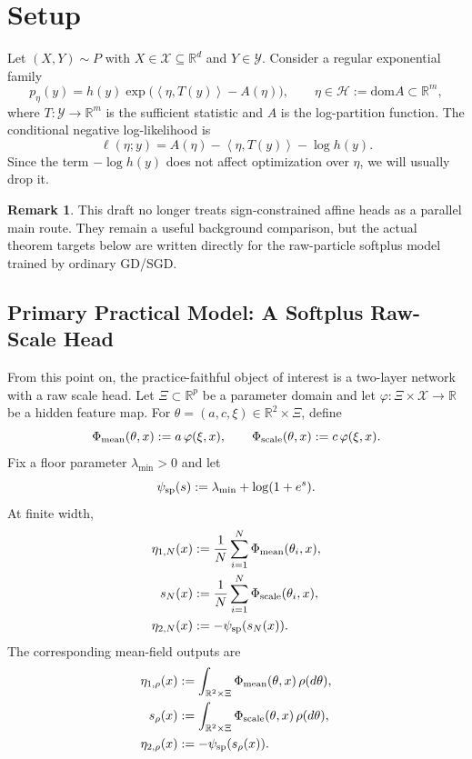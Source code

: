 \documentclass[11pt]{article}
\theoremstyle{definition}
\newtheorem{remark}[theorem]{Remark}
\newcommand{\R}{\mathbb{R}}
\newcommand{\dom}{\mathrm{dom}}
\newcommand{\ip}[2]{\left\langle #1, #2 \right\rangle}
\newcommand{\mc}[1]{\mathcal{#1}}
\begin{document}
\section{Setup}

Let $(X,Y)\sim P$ with $X\in\mc{X}\subseteq \R^d$ and $Y\in\mc{Y}$. Consider a
regular exponential family
\begin{equation}
  p_\eta(y) = h(y)\exp\!\big(\ip{\eta}{T(y)} - A(\eta)\big),
  \qquad \eta\in \mc{H}:=\dom A \subset \R^m,
\end{equation}
where $T:\mc{Y}\to \R^m$ is the sufficient statistic and $A$ is the log-partition
function. The conditional negative log-likelihood is
\begin{equation}
  \ell(\eta;y) = A(\eta) - \ip{\eta}{T(y)} - \log h(y).
\end{equation}
Since the term $-\log h(y)$ does not affect optimization over $\eta$, we will
usually drop it.

\begin{remark}
This draft no longer treats sign-constrained affine heads as a parallel main
route. They remain a useful background comparison, but the actual theorem
targets below are written directly for the raw-particle softplus model trained
by ordinary GD/SGD.
\end{remark}

\subsection{Primary Practical Model: A Softplus Raw-Scale Head}

From this point on, the practice-faithful object of interest is a two-layer
network with a raw scale head. Let $\Xi\subset \R^p$ be a parameter domain and
let $\varphi:\Xi\times \mc{X}\to \R$ be a hidden feature map. For
$\theta=(a,c,\xi)\in \R^2\times \Xi$, define
\[
  \Phi_{\rm mean}(\theta,x):=a\,\varphi(\xi,x),
  \qquad
  \Phi_{\rm scale}(\theta,x):=c\,\varphi(\xi,x).
\]
Fix a floor parameter $\lambda_{\min}>0$ and let
\[
  \psi_{\rm sp}(s):=\lambda_{\min}+\log(1+e^s).
\]
At finite width,
\begin{align}
  \eta_{1,N}(x)
  &:=
  \frac1N\sum_{i=1}^N \Phi_{\rm mean}(\theta_i,x),
  \\
  s_N(x)
  &:=
  \frac1N\sum_{i=1}^N \Phi_{\rm scale}(\theta_i,x),
  \\
  \eta_{2,N}(x)
  &:=
  -\psi_{\rm sp}(s_N(x)).
  \label{eq:softplus-finite-width-head}
\end{align}
The corresponding mean-field outputs are
\begin{align}
  \eta_{1,\rho}(x)
  &:=
  \int_{\R^2\times\Xi}\Phi_{\rm mean}(\theta,x)\,\rho(d\theta),
  \\
  s_\rho(x)
  &:=
  \int_{\R^2\times\Xi}\Phi_{\rm scale}(\theta,x)\,\rho(d\theta),
  \\
  \eta_{2,\rho}(x)
  &:=
  -\psi_{\rm sp}(s_\rho(x)).
  \label{eq:softplus-mf-head}
\end{align}
\end{document}
